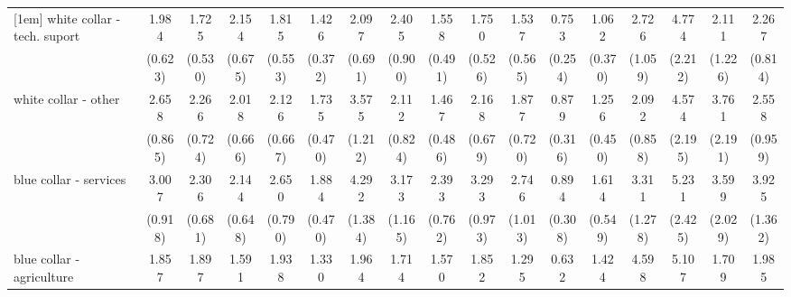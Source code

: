 {\begin{tabular}{l*{16}{c}}
[1em]
white collar - tech. suport&       1.984\sym{*}  &       1.725         &       2.154\sym{*}  &       1.815         &       1.426         &       2.097\sym{*}  &       2.405\sym{*}  &       1.558         &       1.750         &       1.537         &       0.753         &       1.062         &       2.726\sym{**} &       4.774\sym{***}&       2.111         &       2.267\sym{*}  \\
                    &     (0.623)         &     (0.530)         &     (0.675)         &     (0.553)         &     (0.372)         &     (0.691)         &     (0.900)         &     (0.491)         &     (0.526)         &     (0.565)         &     (0.254)         &     (0.370)         &     (1.059)         &     (2.212)         &     (1.226)         &     (0.814)         \\
[1em]
white collar - other&       2.658\sym{**} &       2.266\sym{*}  &       2.018\sym{*}  &       2.126\sym{*}  &       1.735\sym{*}  &       3.575\sym{***}&       2.112         &       1.467         &       2.168\sym{*}  &       1.877         &       0.879         &       1.256         &       2.092         &       4.574\sym{**} &       3.761\sym{*}  &       2.558\sym{*}  \\
                    &     (0.865)         &     (0.724)         &     (0.666)         &     (0.667)         &     (0.470)         &     (1.212)         &     (0.824)         &     (0.486)         &     (0.679)         &     (0.720)         &     (0.316)         &     (0.450)         &     (0.858)         &     (2.195)         &     (2.191)         &     (0.959)         \\
[1em]
blue collar - services&       3.007\sym{***}&       2.306\sym{**} &       2.144\sym{*}  &       2.650\sym{**} &       1.884\sym{*}  &       4.292\sym{***}&       3.173\sym{**} &       2.393\sym{**} &       3.293\sym{***}&       2.746\sym{**} &       0.894         &       1.614         &       3.311\sym{**} &       5.231\sym{***}&       3.599\sym{*}  &       3.925\sym{***}\\
                    &     (0.918)         &     (0.681)         &     (0.648)         &     (0.790)         &     (0.470)         &     (1.384)         &     (1.165)         &     (0.762)         &     (0.973)         &     (1.013)         &     (0.308)         &     (0.549)         &     (1.278)         &     (2.425)         &     (2.029)         &     (1.362)         \\
[1em]
blue collar - agriculture&       1.857         &       1.897         &       1.591         &       1.938         &       1.330         &       1.964         &       1.714         &       1.570         &       1.852         &       1.295         &       0.632         &       1.424         &       4.598\sym{***}&       5.107\sym{**} &       1.709         &       1.985         \\

\end{tabular}}
